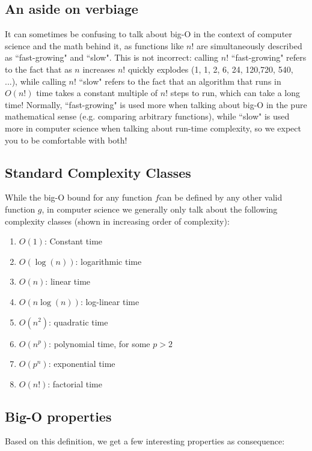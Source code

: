\subsection{An aside on verbiage}
It can sometimes be confusing to talk about big-O in the context of computer science and the math behind it, as functions like $n!$ are simultaneously described as ``fast-growing" and ``slow". This is not incorrect: calling  $n!$ ``fast-growing" refers to the fact that as $n$ increases $n!$ quickly explodes (1, 1, 2, 6, 24, 120,720, 540, ...), while calling $n!$ ``slow" refers to the fact that an algorithm that runs in $O(n!)$ time takes a constant multiple of $n!$ steps to run, which can take a long time! Normally, ``fast-growing" is used more when talking about big-O in the pure mathematical sense (e.g. comparing arbitrary functions), while ``slow" is used more in computer science when talking about run-time complexity, so we expect you to be comfortable with both!


\subsection{Standard Complexity Classes}

While the big-O bound for any function $f$can be defined by any other valid function $g$, in computer science we generally only talk about the following complexity classes (shown in increasing order of complexity):

\begin{enumerate}
    \item $O(1)$: Constant time
    \item $O(\log(n))$: logarithmic time
    \item $O(n)$: linear time
    \item $O(n\log(n))$: log-linear time
    \item $O(n^2)$: quadratic time
    \item $O(n^p)$: polynomial time, for some $p > 2$
    \item $O(p^n)$: exponential time
    \item $O(n!)$: factorial time
\end{enumerate}


\subsection{Big-O properties}

Based on this definition, we get a few interesting properties as consequence:

